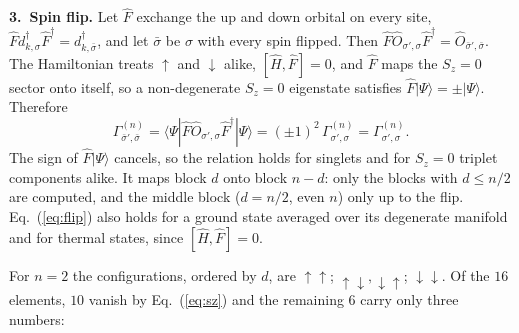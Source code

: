 \documentclass[11pt]{article}
\newcommand{\rdm}{\Gamma^{(n)}}
\begin{document}
\textbf{3.\ Spin flip.} Let $\hat F$ exchange the up and down orbital on every site, $\hat F d^\dagger_{k,\sigma}\hat F^\dagger=d^\dagger_{k,\bar\sigma}$,
and let $\bar\sigma$ be $\sigma$ with every spin flipped. Then
$\hat F\hat O_{\sigma',\sigma}\hat F^\dagger=\hat O_{\bar\sigma',\bar\sigma}$. The Hamiltonian treats $\uparrow$ and
$\downarrow$ alike, $[\hat H,\hat F]=0$, and $\hat F$ maps the $S_z=0$ sector onto itself, so a
non-degenerate $S_z=0$ eigenstate satisfies $\hat F|\Psi\rangle=\pm|\Psi\rangle$. Therefore
\begin{equation}
  \rdm_{\bar\sigma',\bar\sigma}=\langle\Psi|\hat F\hat O_{\sigma',\sigma}\hat F^\dagger|\Psi\rangle
  =(\pm1)^2\,\rdm_{\sigma',\sigma}=\rdm_{\sigma',\sigma}.
  \label{eq:flip}
\end{equation}
The sign of $\hat F|\Psi\rangle$ cancels, so the relation holds for singlets and for $S_z=0$ triplet
components alike. It maps block $d$ onto block $n-d$: only the blocks with $d\le n/2$ are computed,
and the middle block ($d=n/2$, even $n$) only up to the flip. Eq.~(\ref{eq:flip}) also holds for a
ground state averaged over its degenerate manifold and for thermal states, since $[\hat H,\hat F]=0$.

For $n=2$ the configurations, ordered by $d$, are $\uparrow\uparrow$; $\uparrow\downarrow,\downarrow\uparrow$; $\downarrow\downarrow$.
Of the $16$ elements, $10$ vanish by Eq.~(\ref{eq:sz}) and the remaining $6$ carry only three numbers:

\begin{center}
\end{center}
\end{document}
